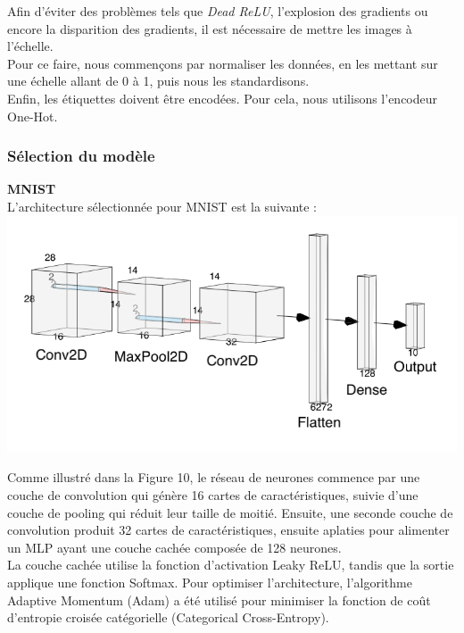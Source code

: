 \begin{multicols}{2}
Afin d’éviter des problèmes tels que \textit{Dead ReLU}, l’explosion des gradients 
ou encore la disparition des gradients, il est nécessaire de mettre les images à l’échelle.\\

Pour ce faire, nous commençons par normaliser les données, en les mettant sur une 
échelle allant de 0 à 1, puis nous les standardisons.\\

Enfin, les étiquettes doivent être encodées. Pour cela, nous utilisons l’encodeur One-Hot.\\

\subsubsection{Sélection du modèle}

\textbf{MNIST} \\

L'architecture sélectionnée pour MNIST est la suivante : \\

\includegraphics[width=\columnwidth]{images/mnist_nn.png}
\hfill\break

Comme illustré dans la Figure 10, le réseau de neurones commence par une couche de convolution qui 
génère 16 cartes de caractéristiques, suivie d’une couche de pooling qui réduit leur taille de moitié.
Ensuite, une seconde couche de convolution produit 32 cartes de caractéristiques, ensuite aplaties pour alimenter 
un MLP ayant une couche cachée composée de 128 neurones. \\

La couche cachée utilise la fonction d’activation Leaky ReLU, tandis que la sortie 
applique une fonction Softmax. Pour optimiser l'architecture, l’algorithme Adaptive Momentum (Adam) a été utilisé pour minimiser 
la fonction de coût d’entropie croisée catégorielle (Categorical Cross-Entropy). \\


\end{multicols}
